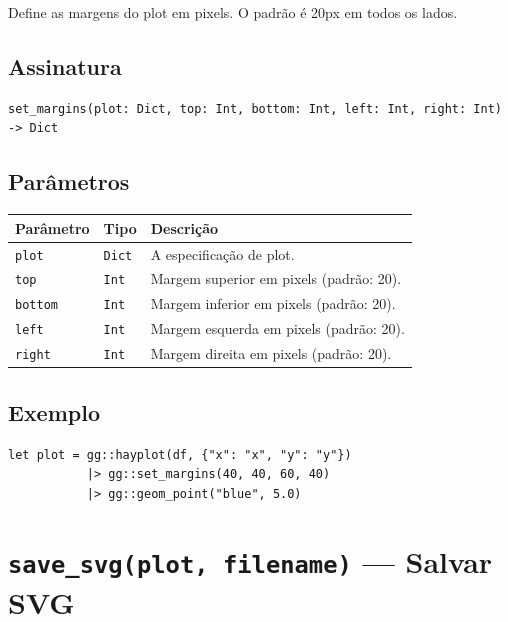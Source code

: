\documentclass[12pt, a4paper, oneside]{book}
\newcommand{\code}[1]{\texttt{#1}}
\begin{document}
Define as margens do plot em pixels. O padrão é 20px em todos os lados.

\subsection*{Assinatura}

\begin{lstlisting}[style=inline]
set_margins(plot: Dict, top: Int, bottom: Int, left: Int, right: Int) -> Dict
\end{lstlisting}

\subsection*{Parâmetros}

\begin{tabularx}{\textwidth}{@{}lL{2.5cm}X@{}}
  \toprule
  \textbf{Parâmetro} & \textbf{Tipo} & \textbf{Descrição} \\
  \midrule
  \code{plot}    & \code{Dict}   & A especificação de plot. \\[4pt]
  \code{top}     & \code{Int}    & Margem superior em pixels (padrão: 20). \\[4pt]
  \code{bottom}  & \code{Int}    & Margem inferior em pixels (padrão: 20). \\[4pt]
  \code{left}    & \code{Int}    & Margem esquerda em pixels (padrão: 20). \\[4pt]
  \code{right}   & \code{Int}    & Margem direita em pixels (padrão: 20). \\
  \bottomrule
\end{tabularx}

\subsection*{Exemplo}

\begin{lstlisting}[caption={Margens customizadas}]
let plot = gg::hayplot(df, {"x": "x", "y": "y"})
           |> gg::set_margins(40, 40, 60, 40)
           |> gg::geom_point("blue", 5.0)
\end{lstlisting}

\section{\texttt{save\_svg(plot, filename)} --- Salvar SVG}
\end{document}
